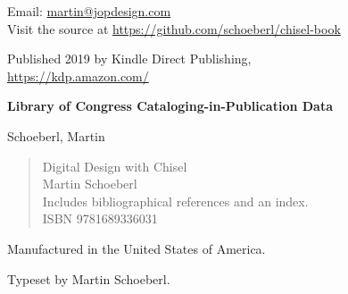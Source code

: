 \documentclass[%
    10pt,
    headinclude, footexclude,
    openright, %
    notitlepage,
    cleardoubleempty,
    headsepline,
    pointlessnumbers,
    bibtotoc, idxtotoc,
    ]{scrbook}
\newif\ifshoworiginal
\newif\ifshowtrans
\begin{document}
\begin{flushleft}
\begin{flushleft}
{\medskip

Email: \url{martin@jopdesign.com}\\
Visit the source at \url{https://github.com/schoeberl/chisel-book}
\medskip

Published 2019 by Kindle Direct Publishing,\\
\url{https://kdp.amazon.com/}
\medskip
\medskip

\textbf{Library of Congress Cataloging-in-Publication Data}
\medskip

Schoeberl, Martin
\begin{quote}
Digital Design with Chisel\\
Martin Schoeberl\\
Includes bibliographical references and an index.\\
ISBN 9781689336031
\end{quote}

\bigskip

Manufactured in the United States of America.

Typeset by Martin Schoeberl.}
\end{flushleft}

\frontmatter

\ifshowtrans %
\renewcommand{\contentsname}{目次}
\fi

\hypertarget{contents}{}
\tableofcontents

\ifshowtrans %
\renewcommand{\listfigurename}{図目次}
\renewcommand{\listtablename}{表目次}
\renewcommand{\lstlistlistingname}{コード目次}
\fi

\begingroup
\let\cleardoublepage\clearpage
\listoffigures
\listoftables
\lstlistoflistings
\endgroup

\ifshoworiginal
\chapter{Foreword}
\fi
\ifshowtrans %
\chapter{まえがき} %
\fi

\medskip
\medskip

\ifshoworiginal
It is an exciting time to be in the world of digital design. With the end of Dennard Scaling and the slowing of Moore's Law, there has perhaps never been a greater need for innovation in the field. Semiconductor companies continue to squeeze out every drop of performance they can, but the cost of these improvements has been rising drastically. Chisel reduces this cost by improving productivity. If designers can build more in less time, while amortizing the cost of verification through reuse, companies can spend less on Non-Recurring Engineering (NRE). In addition, both students and individual contributors can innovate more easily on their own.
\fi


\end{flushleft}
\end{document}

